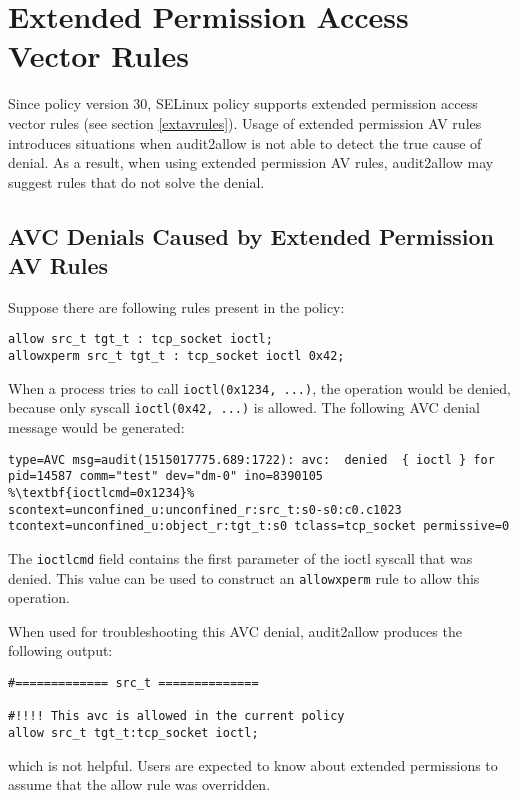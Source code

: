\section{Extended Permission Access Vector Rules}
Since policy version 30, SELinux policy supports extended permission access
vector rules (see section \ref{extavrules}). Usage of extended permission AV
rules introduces situations when audit2allow is not able to detect the true
cause of denial. As a result, when using extended permission AV rules,
audit2allow may suggest rules that do not solve the denial.

\subsection{AVC Denials Caused by Extended Permission AV Rules}
Suppose there are following rules present in the policy:
\begin{lstlisting}
allow src_t tgt_t : tcp_socket ioctl;
allowxperm src_t tgt_t : tcp_socket ioctl 0x42;
\end{lstlisting}
When a process tries to call \texttt{ioctl(0x1234, ...)}, the operation would be
denied, because only syscall \texttt{ioctl(0x42, ...)} is allowed. The following
AVC denial message would be generated:
\begin{lstlisting}[escapechar=\%]
type=AVC msg=audit(1515017775.689:1722): avc:  denied  { ioctl } for
pid=14587 comm="test" dev="dm-0" ino=8390105 %\textbf{ioctlcmd=0x1234}%
scontext=unconfined_u:unconfined_r:src_t:s0-s0:c0.c1023
tcontext=unconfined_u:object_r:tgt_t:s0 tclass=tcp_socket permissive=0
\end{lstlisting}
The \texttt{ioctlcmd} field contains the first parameter of the ioctl syscall
that was denied. This value can be used to construct an \texttt{allowxperm} rule
to allow this operation.

When used for troubleshooting this AVC denial, audit2allow produces the
following output:
\begin{lstlisting}
#============= src_t ==============

#!!!! This avc is allowed in the current policy
allow src_t tgt_t:tcp_socket ioctl;
\end{lstlisting}
which is not helpful. Users are expected to know about extended permissions to 
assume that the allow rule was overridden.

